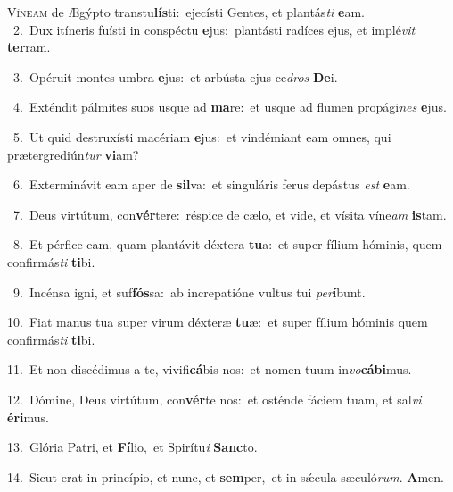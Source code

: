 \lettrine{\initial\textcolor{\initialcolor}{V}}{íneam} de Ægýpto transtu\-\textbf{lís}\-ti:~\star ejecísti Gentes, et plantás\textit{ti} \textbf{e}\-am.\\
{\numbfont\textcolor{\numbcolor}{~2.}}~Dux itíneris fuísti in conspéctu \textbf{e}\-jus:~\star plantásti radíces ejus, et implé\textit{vit} \textbf{ter}\-ram.\par
{\numbfont\textcolor{\numbcolor}{~3.}}~Opéruit montes umbra \textbf{e}\-jus:~\star et arbústa ejus ce\textit{dros} \textbf{De}\-i.\par
{\numbfont\textcolor{\numbcolor}{~4.}}~Exténdit pálmites suos usque ad \textbf{ma}\-re:~\star et usque ad flumen propági\textit{nes} \textbf{e}\-jus.\par
{\numbfont\textcolor{\numbcolor}{~5.}}~Ut quid destruxísti macériam \textbf{e}\-jus:~\star et vindémiant eam omnes, qui prætergrediún\textit{tur} \textbf{vi}\-am?\par
{\numbfont\textcolor{\numbcolor}{~6.}}~Exterminávit eam aper de \textbf{sil}\-va:~\star et singuláris ferus depástus \textit{est} \textbf{e}\-am.\par
{\numbfont\textcolor{\numbcolor}{~7.}}~Deus virtútum, con\-\textbf{vér}\-tere:~\star réspice de cælo, et vide, et vísita víne\textit{am} \textbf{is}\-tam.\par
{\numbfont\textcolor{\numbcolor}{~8.}}~Et pérfice eam, quam plantávit déxtera \textbf{tu}\-a:~\star et super fílium hóminis, quem confirmás\textit{ti} \textbf{ti}\-bi.\par
{\numbfont\textcolor{\numbcolor}{~9.}}~Incénsa igni, et suf\-\textbf{fós}\-sa:~\star ab increpatióne vultus tui \textit{per}\-\textbf{í}bunt.\par
{\numbfont\textcolor{\numbcolor}{10.}}~Fiat manus tua super virum déxteræ \textbf{tu}\-æ:~\star et super fílium hóminis quem confirmás\textit{ti} \textbf{ti}\-bi.\par
{\numbfont\textcolor{\numbcolor}{11.}}~Et non discédimus a te, vivifi\-\textbf{cá}\-bis nos:~\star et nomen tuum in\-\textit{vo}\-\textbf{cá}\textbf{bi}mus.\par
{\numbfont\textcolor{\numbcolor}{12.}}~Dómine, Deus virtútum, con\-\textbf{vér}\-te nos:~\star et osténde fáciem tuam, et sal\textit{vi} \textbf{é}\-\textbf{ri}mus.\par
{\numbfont\textcolor{\numbcolor}{13.}}~Glória Patri, et \textbf{Fí}\-lio,~\star et Spirítu\textit{i} \textbf{Sanc}\-to.\par
{\numbfont\textcolor{\numbcolor}{14.}}~Sicut erat in princípio, et nunc, et \textbf{sem}\-per,~\star et in sǽcula sæculó\-\textit{rum}\-. \textbf{A}\-men.\par
